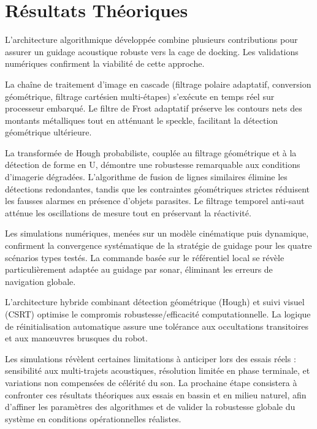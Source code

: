 \section{Résultats Théoriques}

L'architecture algorithmique développée combine plusieurs contributions pour assurer un guidage acoustique robuste vers la cage de docking. Les validations numériques confirment la viabilité de cette approche.

La chaîne de traitement d'image en cascade (filtrage polaire adaptatif, conversion géométrique, filtrage cartésien multi-étapes) s'exécute en temps réel sur processeur embarqué. Le filtre de Frost adaptatif préserve les contours nets des montants métalliques tout en atténuant le speckle, facilitant la détection géométrique ultérieure.

La transformée de Hough probabiliste, couplée au filtrage géométrique et à la détection de forme en U, démontre une robustesse remarquable aux conditions d'imagerie dégradées. L'algorithme de fusion de lignes similaires élimine les détections redondantes, tandis que les contraintes géométriques strictes réduisent les fausses alarmes en présence d'objets parasites. Le filtrage temporel anti-saut atténue les oscillations de mesure tout en préservant la réactivité.

Les simulations numériques, menées sur un modèle cinématique puis dynamique, confirment la convergence systématique de la stratégie de guidage pour les quatre scénarios types testés. La commande basée sur le référentiel local se révèle particulièrement adaptée au guidage par sonar, éliminant les erreurs de navigation globale.

L'architecture hybride combinant détection géométrique (Hough) et suivi visuel (CSRT) optimise le compromis robustesse/efficacité computationnelle. La logique de réinitialisation automatique assure une tolérance aux occultations transitoires et aux manœuvres brusques du robot.

Les simulations révèlent certaines limitations à anticiper lors des essais réels : sensibilité aux multi-trajets acoustiques, résolution limitée en phase terminale, et variations non compensées de célérité du son. La prochaine étape consistera à confronter ces résultats théoriques aux essais en bassin et en milieu naturel, afin d'affiner les paramètres des algorithmes et de valider la robustesse globale du système en conditions opérationnelles réalistes.